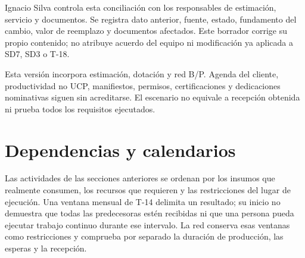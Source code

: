 Ignacio Silva controla esta conciliación con los responsables de estimación, servicio y documentos. Se registra dato anterior, fuente, estado, fundamento del cambio, valor de reemplazo y documentos afectados. Este borrador corrige su propio contenido; no atribuye acuerdo del equipo ni modificación ya aplicada a SD7, SD3 o T-18.

Esta versión incorpora estimación, dotación y red B/P. Agenda del cliente, productividad no UCP, manifiestos, permisos, certificaciones y dedicaciones nominativas siguen sin acreditarse. El escenario no equivale a recepción obtenida ni prueba todos los requisitos ejecutados.

\section{Dependencias y calendarios}\label{sec:t15-dependencias}
Las actividades de las secciones anteriores se ordenan por los insumos que realmente consumen, los recursos que requieren y las restricciones del lugar de ejecución. Una ventana mensual de T-14 delimita un resultado; su inicio no demuestra que todas las predecesoras estén recibidas ni que una persona pueda ejecutar trabajo continuo durante ese intervalo. La red conserva esas ventanas como restricciones y comprueba por separado la duración de producción, las esperas y la recepción.

